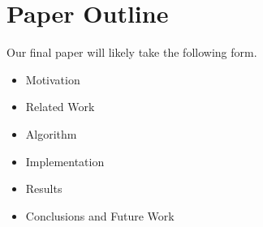 \section{Paper Outline}

Our final paper will likely take the following form.

\begin{itemize}
\item Motivation
\item Related Work
\item Algorithm
\item Implementation
\item Results
\item Conclusions and Future Work
\end{itemize}

